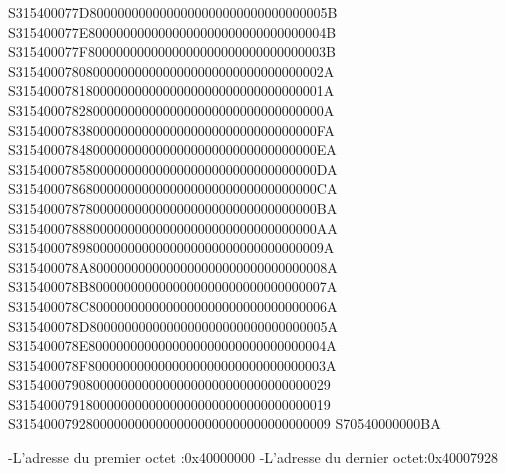 \documentclass[12pt,a4paper]{article}
\begin{document}
\begin{framed}
{S315400077D8000000000000000000000000000000005B\newline
S315400077E8000000000000000000000000000000004B\newline
S315400077F8000000000000000000000000000000003B\newline
S31540007808000000000000000000000000000000002A\newline
S31540007818000000000000000000000000000000001A\newline
S31540007828000000000000000000000000000000000A\newline
S3154000783800000000000000000000000000000000FA\newline
S3154000784800000000000000000000000000000000EA\newline
S3154000785800000000000000000000000000000000DA\newline
S3154000786800000000000000000000000000000000CA\newline
S3154000787800000000000000000000000000000000BA\newline
S3154000788800000000000000000000000000000000AA\newline
S31540007898000000000000000000000000000000009A\newline
S315400078A8000000000000000000000000000000008A\newline
S315400078B8000000000000000000000000000000007A\newline
S315400078C8000000000000000000000000000000006A\newline
S315400078D8000000000000000000000000000000005A\newline
S315400078E8000000000000000000000000000000004A\newline
S315400078F8000000000000000000000000000000003A\newline
S315400079080000000000000000000000000000000029\newline
S315400079180000000000000000000000000000000019\newline
S315400079280000000000000000000000000000000009\newline
S70540000000BA\newline


}
\end{framed}
\newline
\noindent
-L'adresse du premier octet :0x40000000\newline
-L'adresse du dernier octet:0x40007928
\end{document}
